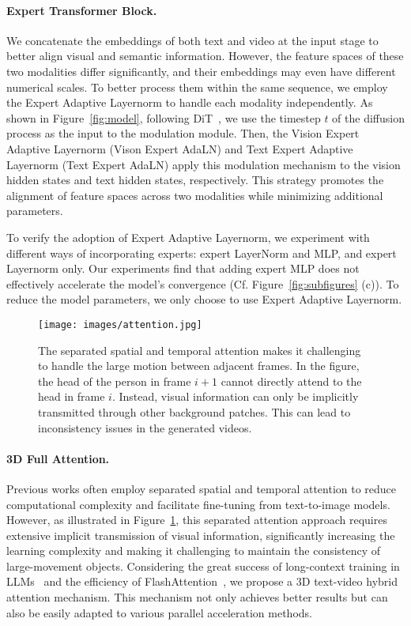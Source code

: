 \documentclass{article} \usepackage{iclr2024_conference,times}
\begin{document}
\paragraph{Expert Transformer Block.}
We concatenate the embeddings of both text and video at the input stage to better align visual and semantic information. 
However, the feature spaces of these two modalities differ significantly, and their embeddings may even have different numerical scales. 
To better process them within the same sequence, we employ the Expert Adaptive Layernorm to handle each modality independently.
As shown in Figure~\ref{fig:model}, following DiT~\cite{peebles2023scalable}, we use the timestep $t$ of the diffusion process as the input to the modulation module. 
Then, the Vision Expert Adaptive Layernorm (Vison Expert AdaLN) and Text Expert Adaptive Layernorm (Text Expert AdaLN) apply this modulation mechanism to the vision hidden states and text hidden states, respectively. 
This strategy promotes the alignment of feature spaces across two modalities while minimizing additional parameters.

To verify the adoption of Expert Adaptive Layernorm, we experiment with different ways of incorporating experts: expert LayerNorm and MLP, and expert Layernorm only. 
Our experiments find that adding expert MLP does not effectively accelerate the model's convergence (Cf. Figure~\ref{fig:subfigures} (c)). 
To reduce the model parameters, we only choose to use Expert Adaptive Layernorm.

\begin{figure}[h]
\centering
\texttt{[image: images/attention.jpg]}
\caption{The separated spatial and temporal attention makes it challenging to  handle the large motion between adjacent frames. 
In the figure, the head of the person in frame $i+1$ cannot directly attend to the head in frame $i$. 
Instead, visual information can only be implicitly transmitted through other background patches. 
This can lead to inconsistency issues in the generated videos.}
\label{fig:attention}
\end{figure}


\paragraph{3D Full Attention.}
Previous works \cite{singer2022make, guo2023animatediff} often employ separated spatial and temporal attention to reduce computational complexity and facilitate fine-tuning from text-to-image models. 
However, as illustrated in Figure~\ref{fig:attention}, this separated attention approach requires extensive implicit transmission of visual information, significantly increasing the learning complexity and making it challenging to maintain the consistency of large-movement objects. 
Considering the great success of long-context training in LLMs~\cite{llama3modelcard, bai2024longalign, xiong2023effective}  and the efficiency of FlashAttention~\cite{dao2022flashattention},  we propose a 3D text-video hybrid attention mechanism. 
This mechanism not only achieves better results but can also be easily adapted to various parallel acceleration methods. 
\end{document}
